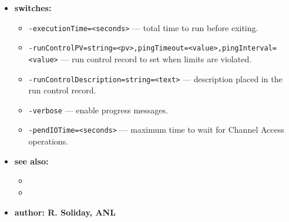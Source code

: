\begin{itemize}
\item {\bf switches:}
\begin{itemize}
\item {\tt -executionTime=<seconds>} --- total time to run before exiting.
\item {\tt -runControlPV=string=<pv>,pingTimeout=<value>,pingInterval=<value>} --- run
control record to set when limits are violated.
\item {\tt -runControlDescription=string=<text>} --- description placed in the run
control record.
\item {\tt -verbose} --- enable progress messages.
\item {\tt -pendIOTime=<seconds>} --- maximum time to wait for Channel Access operations.
\end{itemize}

\item {\bf see also:}
\begin{itemize}
\item {}
\item {}
\end{itemize}

\item {\bf author: R. Soliday, ANL}
\end{itemize}
